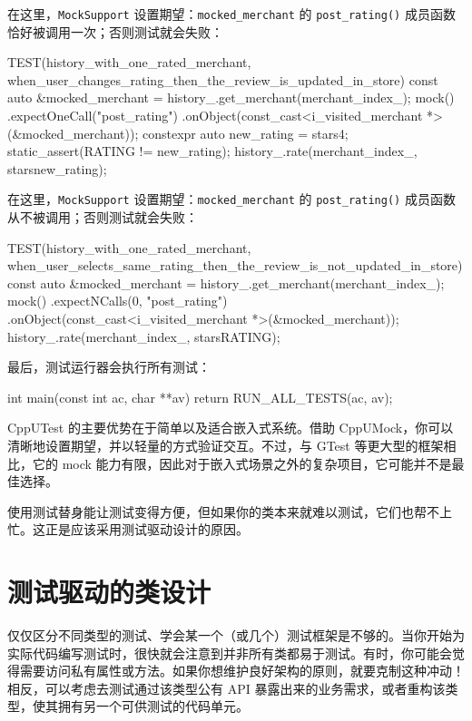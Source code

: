 \label{idx:865}
在这里，\texttt{Mock\allowbreak{}Support} 设置期望：\texttt{mocked\_\allowbreak{}merchant} 的 \texttt{post\_\allowbreak{}rating(\allowbreak{})\allowbreak{}} 成员函数恰好被调用一次；否则测试就会失败：

\begin{codebox}[cpp]
TEST(history_with_one_rated_merchant,
      when_user_changes_rating_then_the_review_is_updated_in_store) {
  const auto &mocked_merchant = history_.get_merchant(merchant_index_);
  mock()
      .expectOneCall("post_rating")
      .onObject(const_cast<i_visited_merchant *>(&mocked_merchant));
  constexpr auto new_rating = stars{4};
  static_assert(RATING != new_rating);
  history_.rate(merchant_index_, stars{new_rating});
}
\end{codebox}

\label{idx:866}
在这里，\texttt{Mock\allowbreak{}Support} 设置期望：\texttt{mocked\_\allowbreak{}merchant} 的 \texttt{post\_\allowbreak{}rating(\allowbreak{})\allowbreak{}} 成员函数从不被调用；否则测试就会失败：

\begin{codebox}[text]
TEST(history_with_one_rated_merchant,
      when_user_selects_same_rating_then_the_review_is_not_updated_in_store) {
  const auto &mocked_merchant = history_.get_merchant(merchant_index_);
  mock()
      .expectNCalls(0, "post_rating")
      .onObject(const_cast<i_visited_merchant *>(&mocked_merchant));
  history_.rate(merchant_index_, stars{RATING});
}
\end{codebox}

最后，测试运行器会执行所有测试：

\begin{codebox}[text]
int main(const int ac, char **av) { return RUN_ALL_TESTS(ac, av); }
\end{codebox}

CppUTest 的主要优势在于简单以及适合嵌入式系统。借助 CppUMock，你可以清晰地设置期望，并以轻量的方式验证交互。不过，与 GTest 等更大型的框架相比，它的 mock 能力有限，因此对于嵌入式场景之外的复杂项目，它可能并不是最佳选择。

\label{idx:867}
使用测试替身能让测试变得方便，但如果你的类本来就难以测试，它们也帮不上忙。这正是应该采用测试驱动设计的原因。

\section{测试驱动的类设计}

\label{idx:868}
仅仅区分不同类型的测试、学会某一个（或几个）测试框架是不够的。当你开始为实际代码编写测试时，很快就会注意到并非所有类都易于测试。有时，你可能会觉得需要访问私有属性或方法。如果你想维护良好架构的原则，就要克制这种冲动！相反，可以考虑去测试通过该类型公有 API 暴露出来的业务需求，或者重构该类型，使其拥有另一个可供测试的代码单元。

